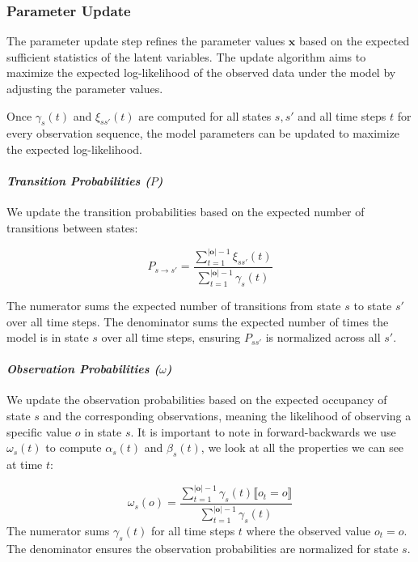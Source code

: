 \subsubsection{Parameter Update}
The parameter update step refines the parameter values $\mathbf{x}$ based on the expected sufficient statistics of the latent variables.
The update algorithm aims to maximize the expected log-likelihood of the observed data under the model by adjusting the parameter values.

Once $\gamma_s(t)$ and $\xi_{ss'}(t)$ are computed for all states $s, s'$ and all time steps $t$ for every observation sequence, the model parameters can be updated to maximize the expected log-likelihood.

\paragraph*{\textit{Transition Probabilities ($P$)}}

We update the transition probabilities based on the expected number of transitions between states:


\begin{equation}
    P_{s \rightarrow s'} = \frac{\sum_{t = 1}^{|\mathbf{o}|-1} \xi_{ss'}(t)}{\sum_{t = 1}^{|\mathbf{o}|-1} \gamma_s(t)}
    \label{eq:transition-probabilities}
\end{equation}


The numerator sums the expected number of transitions from state $s$ to state $s'$ over all time steps.
The denominator sums the expected number of times the model is in state $s$ over all time steps, ensuring $P_{ss'}$ is normalized across all $s'$.

\paragraph*{\textit{Observation Probabilities ($\omega$)}}

We update the observation probabilities based on the expected occupancy of state $s$ and the corresponding observations, meaning the likelihood of observing a specific value $o$ in state $s$.
It is important to note in forward-backwards we use $\omega_s(t)$ to compute $\alpha_s(t)$ and $\beta_s(t)$, we look at all the properties we can see at time $t$:

\begin{equation}
    \omega_s(o) = \frac{\sum_{t = 1}^{|\mathbf{o}|-1} \gamma_s(t) \lBrack o_t = o \rBrack}{\sum_{t = 1}^{|\mathbf{o}|-1} \gamma_s(t)}
    \label{eq:omega}
\end{equation}
The numerator sums $\gamma_s(t)$ for all time steps $t$ where the observed value $o_t = o$.
The denominator ensures the observation probabilities are normalized for state $s$.

